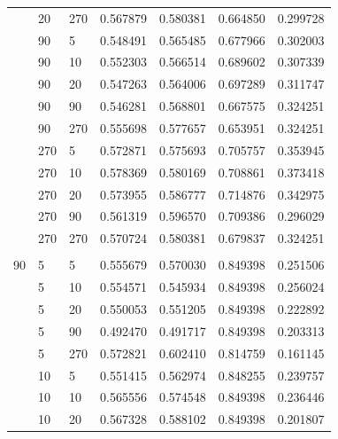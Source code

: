 \documentclass[pageno]{jpaper}
\begin{document}
\begin{longtable}{p{2cm} p{2cm} p{2cm} p{2cm} p{2cm} p{2cm} p{2cm}}
& 20 & 270 & 0.567879 & 0.580381 & 0.664850 & 0.299728 \\

& 90 & 5 & 0.548491 & 0.565485 & 0.677966 & 0.302003 \\

& 90 & 10 & 0.552303 & 0.566514 & 0.689602 & 0.307339 \\

& 90 & 20 & 0.547263 & 0.564006 & 0.697289 & 0.311747 \\

& 90 & 90 & 0.546281 & 0.568801 & 0.667575 & 0.324251 \\

& 90 & 270 & 0.555698 & 0.577657 & 0.653951 & 0.324251 \\

& 270 & 5 & 0.572871 & 0.575693 & 0.705757 & 0.353945 \\

& 270 & 10 & 0.578369 & 0.580169 & 0.708861 & 0.373418 \\

& 270 & 20 & 0.573955 & 0.586777 & 0.714876 & 0.342975 \\

& 270 & 90 & 0.561319 & 0.596570 & 0.709386 & 0.296029 \\

& 270 & 270 & 0.570724 & 0.580381 & 0.679837 & 0.324251 \\
& & & & & & \\
\hline
90 & 5 & 5 & 0.555679 & 0.570030 & 0.849398 & 0.251506 \\

& 5 & 10 & 0.554571 & 0.545934 & 0.849398 & 0.256024 \\

& 5 & 20 & 0.550053 & 0.551205 & 0.849398 & 0.222892 \\

& 5 & 90 & 0.492470 & 0.491717 & 0.849398 & 0.203313 \\

& 5 & 270 & 0.572821 & 0.602410 & 0.814759 & 0.161145 \\

& 10 & 5 & 0.551415 & 0.562974 & 0.848255 & 0.239757 \\

& 10 & 10 & 0.565556 & 0.574548 & 0.849398 & 0.236446 \\

& 10 & 20 & 0.567328 & 0.588102 & 0.849398 & 0.201807 \\


\end{longtable}
\end{document}
